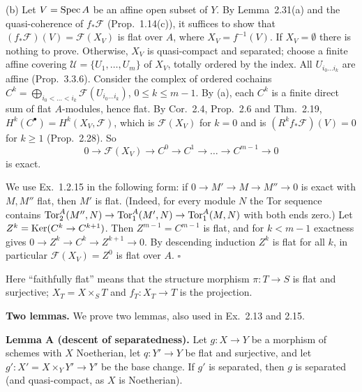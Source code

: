 \documentclass[11pt]{article}
\begin{document}
(b) Let $V=\operatorname{Spec} A$ be an affine open subset of $Y$. By Lemma~2.31(a) and the quasi-coherence of $f_*\mathcal F$ (Prop.~1.14(c)), it suffices to show that $(f_*\mathcal F)(V)=\mathcal F(X_V)$ is flat over $A$, where $X_V=f^{-1}(V)$. If $X_V=\emptyset$ there is nothing to prove. Otherwise, $X_V$ is quasi-compact and separated; choose a finite affine covering $\mathcal U=\{U_1,\dots,U_m\}$ of $X_V$, totally ordered by the index. All $U_{i_0\dots i_k}$ are affine (Prop.~3.3.6). Consider the complex of ordered cochains $C^k=\bigoplus_{i_0<\dots<i_k}\mathcal F(U_{i_0\dots i_k})$, $0\le k\le m-1$. By (a), each $C^k$ is a finite direct sum of flat $A$-modules, hence flat. By Cor.~2.4, Prop.~2.6 and Thm.~2.19, $H^k(C^\bullet)=H^k(X_V,\mathcal F)$, which is $\mathcal F(X_V)$ for $k=0$ and is $(R^kf_*\mathcal F)(V)=0$ for $k\ge1$ (Prop.~2.28). So
\[ 0\to\mathcal F(X_V)\to C^0\to C^1\to\dots\to C^{m-1}\to0 \]
is exact.

We use Ex.~1.2.15 in the following form: if $0\to M'\to M\to M''\to0$ is exact with $M,M''$ flat, then $M'$ is flat. (Indeed, for every module $N$ the Tor sequence contains $\operatorname{Tor}_2^A(M'',N)\to\operatorname{Tor}_1^A(M',N)\to\operatorname{Tor}_1^A(M,N)$ with both ends zero.) Let $Z^k=\operatorname{Ker}(C^k\to C^{k+1})$. Then $Z^{m-1}=C^{m-1}$ is flat, and for $k<m-1$ exactness gives $0\to Z^k\to C^k\to Z^{k+1}\to0$. By descending induction $Z^k$ is flat for all $k$, in particular $\mathcal F(X_V)=Z^0$ is flat over $A$. \hfill$\square$

\pf
Here ``faithfully flat'' means that the structure morphism $\pi:T\to S$ is flat and surjective; $X_T=X\times_ST$ and $f_T:X_T\to T$ is the projection.

\textbf{Two lemmas.} We prove two lemmas, also used in Ex.~2.13 and 2.15.

\textbf{Lemma A (descent of separatedness).} Let $g:X\to Y$ be a morphism of schemes with $X$ Noetherian, let $q:Y'\to Y$ be flat and surjective, and let $g':X'=X\times_YY'\to Y'$ be the base change. If $g'$ is separated, then $g$ is separated (and quasi-compact, as $X$ is Noetherian).
\end{document}
